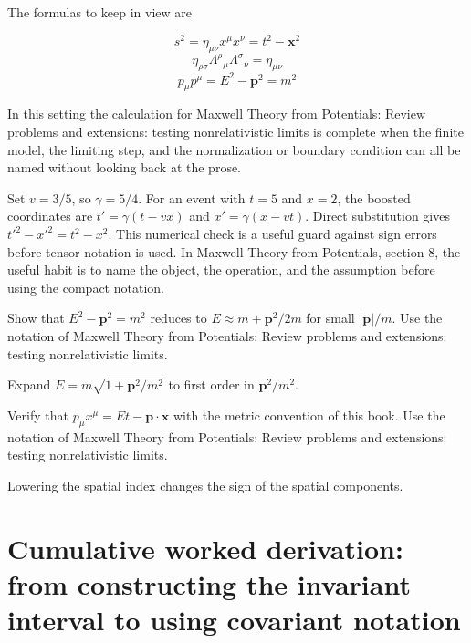 The formulas to keep in view are

\[
  s^2=\eta_{\mu\nu}x^\mu x^\nu=t^2-\bm x^2
\]
\[
  \eta_{\rho\sigma}\Lambda^\rho{}_\mu\Lambda^\sigma{}_\nu=\eta_{\mu\nu}
\]
\[
  p_\mu p^\mu=E^2-\bm p^2=m^2
\]

In this setting the calculation for Maxwell Theory from Potentials: Review problems and extensions: testing nonrelativistic limits is complete when the finite model, the limiting step, and the normalization or boundary condition can all be named without looking back at the prose.




\begin{example}
Set \(v=3/5\), so \(\gamma=5/4\).  For an event with \(t=5\) and \(x=2\), the boosted coordinates are \(t'=\gamma(t-vx)\) and \(x'=\gamma(x-vt)\).  Direct substitution gives \(t'^2-x'^2=t^2-x^2\).  This numerical check is a useful guard against sign errors before tensor notation is used.  In Maxwell Theory from Potentials, section 8, the useful habit is to name the object, the operation, and the assumption before using the compact notation.
\end{example}



\begin{exercise}
Show that \(E^2-\bm p^2=m^2\) reduces to \(E\approx m+\bm p^2/2m\) for small \(|\bm p|/m\).  Use the notation of Maxwell Theory from Potentials: Review problems and extensions: testing nonrelativistic limits.
\begin{answer}
Expand \(E=m\sqrt{1+\bm p^2/m^2}\) to first order in \(\bm p^2/m^2\).
\end{answer}
\end{exercise}

\begin{exercise}
Verify that \(p_\mu x^\mu=Et-\bm p\cdot\bm x\) with the metric convention of this book.  Use the notation of Maxwell Theory from Potentials: Review problems and extensions: testing nonrelativistic limits.
\begin{answer}
Lowering the spatial index changes the sign of the spatial components.
\end{answer}
\end{exercise}



\section{Cumulative worked derivation: from constructing the invariant interval to using covariant notation}

